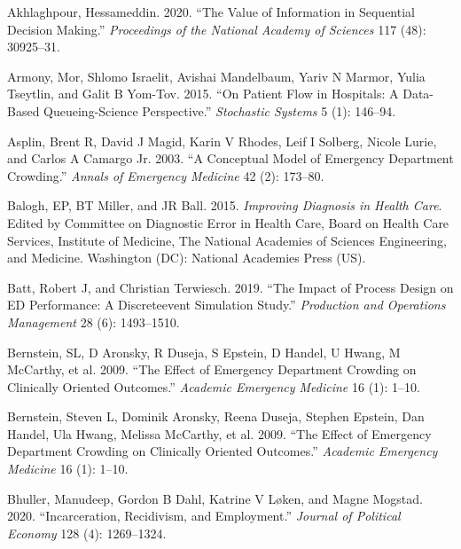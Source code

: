 \documentclass{article}
\newlength{\cslhangindent}
\newlength{\cslentryspacingunit} %
\newenvironment{CSLReferences}[2] %
 {%
  \setlength{\parindent}{0pt}
  \ifodd #1
  \let\oldpar\par
  \def\par{\hangindent=\cslhangindent\oldpar}
  \fi
  \setlength{\parskip}{#2\cslentryspacingunit}
 }%
 {}
\begin{document}
\hypertarget{refs}{}
\begin{CSLReferences}{1}{0}
\leavevmode{}%
Akhlaghpour, Hessameddin. 2020. {``The Value of Information in
Sequential Decision Making.''} \emph{Proceedings of the National Academy
of Sciences} 117 (48): 30925--31.

\leavevmode{}%
Armony, Mor, Shlomo Israelit, Avishai Mandelbaum, Yariv N Marmor, Yulia
Tseytlin, and Galit B Yom-Tov. 2015. {``On Patient Flow in Hospitals: A
Data-Based Queueing-Science Perspective.''} \emph{Stochastic Systems} 5
(1): 146--94.

\leavevmode{}%
Asplin, Brent R, David J Magid, Karin V Rhodes, Leif I Solberg, Nicole
Lurie, and Carlos A Camargo Jr. 2003. {``A Conceptual Model of Emergency
Department Crowding.''} \emph{Annals of Emergency Medicine} 42 (2):
173--80.

\leavevmode{}%
Balogh, EP, BT Miller, and JR Ball. 2015. \emph{Improving Diagnosis in
Health Care}. Edited by Committee on Diagnostic Error in Health Care,
Board on Health Care Services, Institute of Medicine, The National
Academies of Sciences Engineering, and Medicine. Washington (DC):
National Academies Press (US).

\leavevmode{}%
Batt, Robert J, and Christian Terwiesch. 2019. {``The Impact of Process
Design on ED Performance: A Discreteevent Simulation Study.''}
\emph{Production and Operations Management} 28 (6): 1493--1510.

\leavevmode{}%
Bernstein, SL, D Aronsky, R Duseja, S Epstein, D Handel, U Hwang, M
McCarthy, et al. 2009. {``The Effect of Emergency Department Crowding on
Clinically Oriented Outcomes.''} \emph{Academic Emergency Medicine} 16
(1): 1--10.

\leavevmode{}%
Bernstein, Steven L, Dominik Aronsky, Reena Duseja, Stephen Epstein, Dan
Handel, Ula Hwang, Melissa McCarthy, et al. 2009. {``The Effect of
Emergency Department Crowding on Clinically Oriented Outcomes.''}
\emph{Academic Emergency Medicine} 16 (1): 1--10.

\leavevmode{}%
Bhuller, Manudeep, Gordon B Dahl, Katrine V Løken, and Magne Mogstad.
2020. {``Incarceration, Recidivism, and Employment.''} \emph{Journal of
Political Economy} 128 (4): 1269--1324.


\end{CSLReferences}
\end{document}
